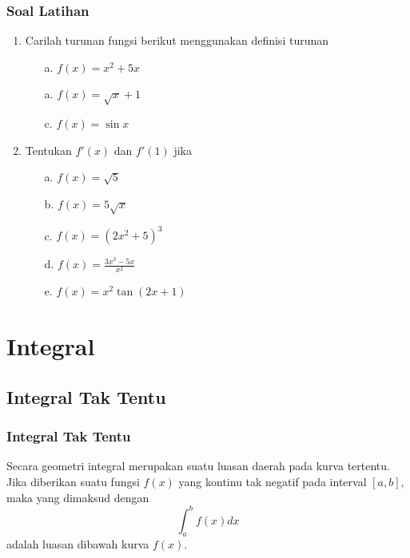 \documentclass[pdflatex,compress,mathserif]{beamer}
\begin{document}
	\begin{frame}
		\frametitle{Soal Latihan}
		\begin{enumerate}
			\item Carilah turunan fungsi berikut menggunakan definisi turunan
			\begin{enumerate}
				\item[a.] $ f(x) = x^2 + 5x $
				\item[a.] $ f(x) = \sqrt{x} + 1 $
				\item[c.] $ f(x) = \sin x $
			\end{enumerate}
			\item Tentukan $ f'(x) $ dan $ f'(1) $ jika
			\begin{enumerate}
				\item[a.] $ f(x) = \sqrt{5} $
				\item[b.] $ f(x) = 5\sqrt{x} $
				\item[c.] $ f(x) = \left(2x^2+5\right)^3 $
				\item[d.] $ f(x) = \frac{3x^3-5x}{x^2} $
				\item[e.] $ f(x) = x^2 \tan(2x+1) $
			\end{enumerate}
		\vfill\null
		\end{enumerate}
	\end{frame}

\section{Integral}
	
	\subsection{Integral Tak Tentu}
		
		\begin{frame}
			\frametitle{Integral Tak Tentu}
			Secara geometri integral merupakan suatu luasan daerah pada kurva tertentu. Jika diberikan suatu fungsi $ f(x) $ yang kontinu tak negatif pada interval $ [a, b] $, maka yang dimaksud dengan
			\begin{equation}
				\int_a^b f(x) dx
			\end{equation}
			adalah luasan dibawah kurva $ f(x) $. 
		\end{frame}
	
\end{document}
